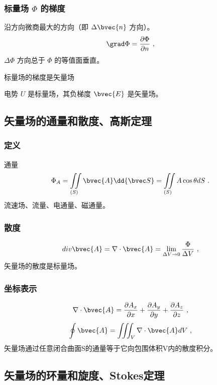 \subsubsection{标量场 $\Phi$ 的梯度}
沿方向微商最大的方向（即 $\Delta \bvec{n}$ 方向）。
\begin{equation}\label{eq_VecAnl_5}
\grad \Phi = \frac{\partial \Phi}{\partial n}~,
\end{equation}
$\Delta \Phi$ 方向总于 $\Phi$ 的等值面垂直。

标量场的梯度是矢量场

电势 $U$ 是标量场，其负梯度 $\bvec{E}$ 是矢量场。

\subsection{矢量场的通量和散度、高斯定理}%
\subsubsection{定义}
通量
\begin{equation}\label{eq_VecAnl_6}
\Phi_A=\iint\limits_{(S)} \bvec{A} \dd{\bvec S} = \iint\limits_{(S)} A\cos\theta dS~.
\end{equation}
流速场、流量、电通量、磁通量。

\subsubsection{散度}
\begin{equation}\label{eq_VecAnl_7}
div \bvec{A}=\nabla \cdot \bvec{A}=\lim_{\Delta V \to 0}\frac{\Phi}{\Delta V}~,
\end{equation}
矢量场的散度是标量场。

\subsubsection{坐标表示}
\begin{equation}\label{eq_VecAnl_8}
\nabla \cdot \bvec{A}= \frac{\partial A_x}{\partial x}+\frac{\partial A_y}{\partial y}+\frac{\partial A_z}{\partial z}~,
\end{equation}
\begin{equation}\label{eq_VecAnl_9}
\oint \bvec{A}=\iiint_V \nabla \cdot \bvec{A} dV~,
\end{equation}
矢量场通过任意闭合曲面S的通量等于它向包围体积V内的散度积分。
\subsection{矢量场的环量和旋度、Stokes定理}%

